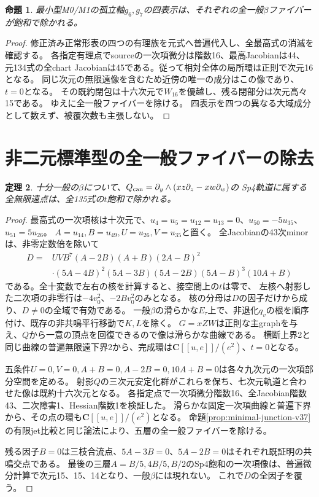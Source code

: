 \documentclass[11pt,a4paper]{ltjsarticle}
\newcommand{\CC}{\mathbf C}
\newtheorem{theorem}{定理}[section]
\newtheorem{proposition}[theorem]{命題}
\theoremstyle{remark}
\begin{document}
\begin{proposition}
最小型M0/M1の孤立軸$g_6,g_7$の四表示は、それぞれの全一般$\beta$ファイバーが飽和で除かれる。
\end{proposition}
\begin{proof}
修正済み正常形表の四つの有理族を元式へ普遍代入し、全最高式の消滅を確認する。
各指定有理点でsourceの一次項微分は階数16、最高Jacobianは44、
元134式の全chart Jacobianは45である。従って相対全体の局所環は正則で次元16となる。
同じ次元の無限遠像を含むため近傍の唯一の成分はこの像であり、$t=0$となる。
その既約閉包は十六次元で$W_{16}$を優越し、残る閉部分は次元高々15である。
ゆえに全一般ファイバーを除ける\cite{minimal-axis-all-v37}。
四表示を四つの異なる大域成分として数えず、被覆次数も主張しない。
\end{proof}

\section{非二元標準型の全一般ファイバーの除去}

\begin{theorem}\label{thm:nonbinary-canonical-v37}
十分一般の$\beta$について、$Q_{\rm can}=\partial_y\wedge(xz\partial_z-xw\partial_w)$の
Sp4軌道に属する全無限遠点は、全135式の$t$飽和で除かれる。
\end{theorem}
\begin{proof}
最高式の一次項核は十次元で、$u_4=u_5=u_{12}=u_{13}=0$、$u_{50}=-5u_{35}$、$u_{51}=5u_{26}$。
$A=u_{14},B=u_{49},U=u_{26},V=u_{35}$と置く。
全Jacobianの43次minorは、非零定数倍を除いて
\begin{align*}
D={}&UV B^7(A-2B)(A+B)(2A-B)^2\\
 &\cdot(5A-4B)^2(5A-3B)(5A-2B)(5A-B)^3(10A+B)
\end{align*}
である。全十変数で左右の核を計算すると、接空間上の$t$は零で、
左核へ射影した二次項の非零行は$-4v_0^2$、$-2Bv_0^2$のみとなる。
核の分母は$D$の因子だけから成り、$D\ne0$の全域で有効である。
一般$\beta$の滑らかな$E_\tau$上で、非退化$q_v$の根を順序付け、既存の非共鳴平行移動で$K,L$を除く。
$G=xZW$は正則な主graphを与え、$Q$から一意の頂点を回復できるので像は滑らかな曲線である。
横断上界2と同じ曲線の普遍無限遠下界2から、完成環は$\CC[[u,e]]/(e^2)$、$t=0$となる。

五条件$U=0,V=0,A+B=0,A-2B=0,10A+B=0$は各々九次元の一次項部分空間を定める。
射影$Q$の三次元安定化群がこれらを保ち、七次元軌道と合わせた像は既約十六次元となる。
各指定点で一次項微分階数16、全Jacobian階数43、二次障害1、Hessian階数1を検証した。
滑らかな固定一次項曲線と普遍下界から、その点の環も$\CC[[u,e]]/(e^2)$となる。
命題\ref{prop:minimal-junction-v37}の有限jet比較と同じ論法により、五層の全一般ファイバーを除ける。

残る因子$B=0$は三枝合流点、$5A-3B=0$、$5A-2B=0$はそれぞれ既証明の共鳴交点である。
最後の三層$A=B/5,4B/5,B/2$のSp4飽和の一次項像は、普遍微分計算で次元15、15、14となり、一般$\beta$には現れない。
これで$D$の全因子を覆う\cite{nonbinary-exclusions-v37,nonbinary-canonical-v37}。
\end{proof}
\end{document}
